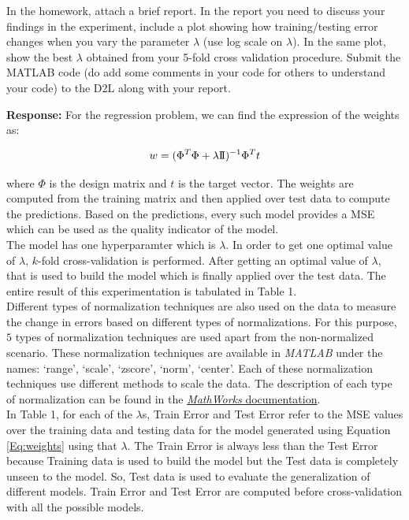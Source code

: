 \documentclass[11pt]{article}
\begin{document}
In the homework, attach a brief report. In the report you need to
discuss your findings in the experiment, include a plot showing how
training/testing error changes when you vary the parameter $\lambda$ (use log
scale on $\lambda$). In the same plot, show the best $\lambda$ obtained from
your 5-fold cross validation procedure. Submit the MATLAB code (do add some comments in your code for others to understand your code) to the D2L along with your report. 

\textbf{Response:}
For the regression problem, we can find the expression of the weights as:

\begin{equation}
	w = (\Phi^T \Phi + \lambda {\rm\hbox{I\kern-.15em I}})^{-1} \Phi^T t
	\label{Eq:weights}
\end{equation}

where $\Phi$ is the design matrix and $t$ is the target vector. The weights are computed from the training matrix and then applied over test data to compute the predictions. Based on the predictions, every such model provides a MSE which can be used as the quality indicator of the model.\\

The model has one hyperparamter which is $\lambda$. In order to get one optimal value of $\lambda$, $k$-fold cross-validation is performed. After getting an optimal value of $\lambda$, that is used to build the model which is finally applied over the test data. The entire result of this experimentation is tabulated in Table 1.\\

Different types of normalization techniques are also used on the data to measure the change in errors based on different types of normalizations. For this purpose, $5$ types of normalization techniques are used apart from the non-normalized scenario. These normalization techniques are available in \textit{MATLAB} under the names: `range', `scale', `zscore', `norm', `center'. Each of these normalization techniques use different methods to scale the data. The description of each type of normalization can be found in the \href{https://in.mathworks.com/help/matlab/ref/double.normalize.html}{\textit{MathWorks} documentation}.\\ 

In Table 1, for each of the $\lambda$s, Train Error and Test Error refer to the MSE values over the training data and testing data for the model generated using Equation \ref{Eq:weights} using that $\lambda$. The Train Error is always less than the Test Error because Training data is used to build the model but the Test data is completely unseen to the model. So, Test data is used to evaluate the generalization of different models. Train Error and Test Error are computed before cross-validation with all the possible models.\\  
\end{document}
